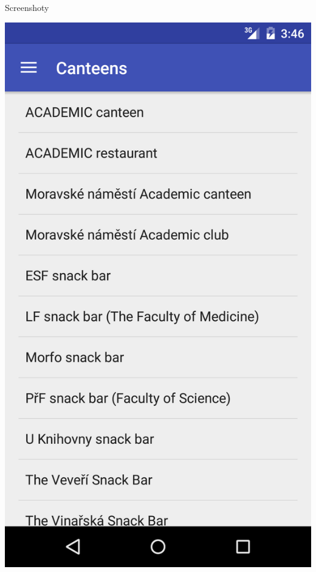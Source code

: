 \documentclass[pdf]{beamer}
\begin{document}
\begin{frame}{Screenshoty}
\begin{center}
    \hspace{10px}
    \includegraphics[scale=0.1]{app-list2}
  \end{center}
\end{frame}
\end{document}

